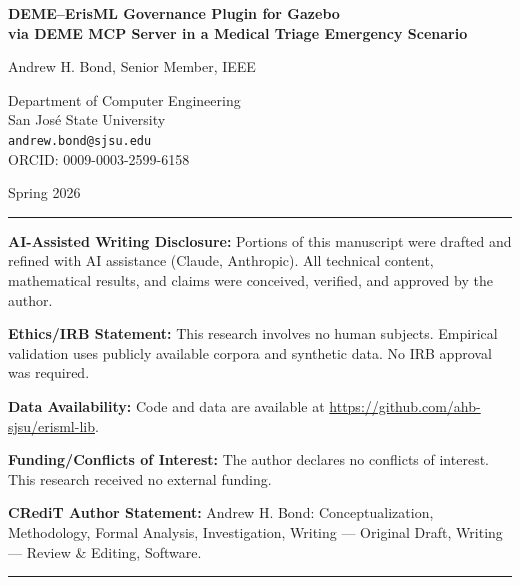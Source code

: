 \documentclass[12pt,letterpaper]{article}
\begin{document}
\begin{titlepage}
\centering
\vspace*{2cm}

{\LARGE\bfseries DEME--ErisML Governance Plugin for Gazebo\\
 via DEME MCP Server in a Medical Triage Emergency Scenario\par}

\vspace{2cm}

{\large Andrew H. Bond, Senior Member, IEEE\par}
\vspace{0.5cm}
{\normalsize Department of Computer Engineering\\
San Jos\'{e} State University\\
\texttt{andrew.bond@sjsu.edu}\\
ORCID: 0009-0003-2599-6158\par}

\vspace{1cm}

{\normalsize Spring 2026\par}

\vfill

\noindent\rule{\textwidth}{0.4pt}
\small

\noindent\textbf{AI-Assisted Writing Disclosure:} Portions of this manuscript were drafted and refined with AI assistance (Claude, Anthropic). All technical content, mathematical results, and claims were conceived, verified, and approved by the author.

\vspace{0.5em}
\noindent\textbf{Ethics/IRB Statement:} This research involves no human subjects. Empirical validation uses publicly available corpora and synthetic data. No IRB approval was required.

\vspace{0.5em}
\noindent\textbf{Data Availability:} Code and data are available at \url{https://github.com/ahb-sjsu/erisml-lib}.

\vspace{0.5em}
\noindent\textbf{Funding/Conflicts of Interest:} The author declares no conflicts of interest. This research received no external funding.

\vspace{0.5em}
\noindent\textbf{CRediT Author Statement:} Andrew H. Bond: Conceptualization, Methodology, Formal Analysis, Investigation, Writing --- Original Draft, Writing --- Review \& Editing, Software.

\normalsize
\noindent\rule{\textwidth}{0.4pt}

\end{titlepage}
\end{document}
